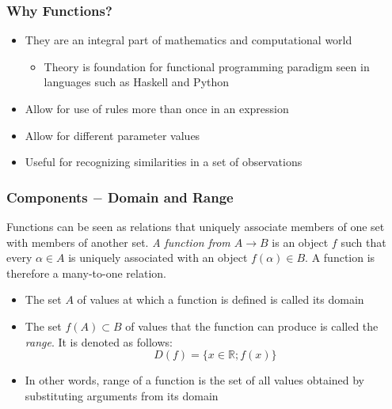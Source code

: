 \documentclass{beamer}
\begin{document}
\begin{frame}[fragile]\frametitle{Why Functions?}

\begin{itemize}
  \item They are an integral part of mathematics and computational world
    \begin{itemize}
      \item Theory is foundation for functional programming paradigm seen in languages such as Haskell and Python
    \end{itemize}
  \item Allow for use of rules more than once in an expression
  \item Allow for different parameter values
  \item Useful for recognizing similarities in a set of observations

\end{itemize}

\end{frame}

\begin{frame}[fragile]\frametitle{Components $-$ Domain and Range}

Functions can be seen as relations that uniquely associate members of one set with members of another set. \textit{A function from $A \to B$} is an object $f$ such that every $\alpha \in A$ is uniquely associated with an object $f(\alpha) \in B$. A function is therefore a many-to-one relation.

\vfill
\begin{itemize}
  \item The set $A$ of values at which a function is defined is called its domain
  \item The set $f(A) \subset B$ of values that the function can produce is called the \textit{range}. It is denoted as follows:
  \begin{equation*}
    D(f) = \lbrace x \in \mathbb{R}; f(x) \rbrace
  \end{equation*}
  \item In other words, range of a function is the set of all values obtained by substituting arguments from its domain

\end{itemize}

\end{frame}
\end{document}
